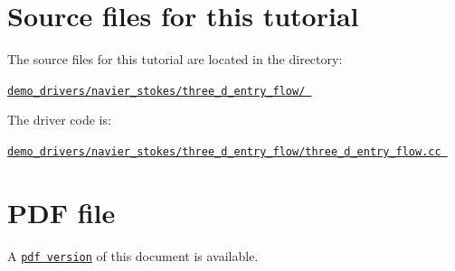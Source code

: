  

\hypertarget{index_sources}{}\section{Source files for this tutorial}\label{index_sources}

\begin{DoxyItemize}
\item The source files for this tutorial are located in the directory\+: \begin{center} \href{../../../../demo_drivers/navier_stokes/three_d_entry_flow/}{\tt demo\+\_\+drivers/navier\+\_\+stokes/three\+\_\+d\+\_\+entry\+\_\+flow/ } \end{center} 
\item The driver code is\+: \begin{center} \href{../../../../demo_drivers/navier_stokes/three_d_entry_flow/three_d_entry_flow.cc}{\tt demo\+\_\+drivers/navier\+\_\+stokes/three\+\_\+d\+\_\+entry\+\_\+flow/three\+\_\+d\+\_\+entry\+\_\+flow.\+cc } \end{center} 
\end{DoxyItemize}



 

 \hypertarget{index_pdf}{}\section{P\+D\+F file}\label{index_pdf}
A \href{../latex/refman.pdf}{\tt pdf version} of this document is available. 
